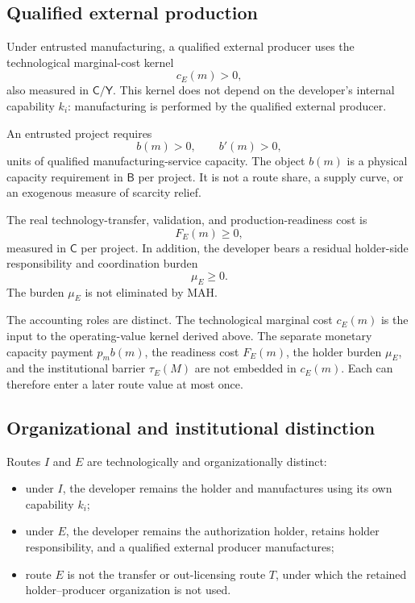 \subsection{Qualified external production}
\label{subsec:p03-external}

Under entrusted manufacturing, a qualified external producer uses the
technological marginal-cost kernel
\begin{equation}
  c_E(m)>0,
  \label{eq:p03-external-cost}
\end{equation}
also measured in \(\mathsf C/\mathsf Y\). This kernel does not depend on the
developer's internal capability \(k_i\): manufacturing is performed by the
qualified external producer.

An entrusted project requires
\begin{equation}
  b(m)>0,
  \qquad b'(m)>0,
  \label{eq:p03-capacity-requirement}
\end{equation}
units of qualified manufacturing-service capacity. The object \(b(m)\) is a
physical capacity requirement in \(\mathsf B\) per project. It is not a route
share, a supply curve, or an exogenous measure of scarcity relief.

The real technology-transfer, validation, and production-readiness cost is
\begin{equation}
  F_E(m)\geq0,
  \label{eq:p03-external-fixed-cost}
\end{equation}
measured in \(\mathsf C\) per project. In addition, the developer bears a
residual holder-side responsibility and coordination burden
\begin{equation}
  \mu_E\geq0.
  \label{eq:p03-holder-burden}
\end{equation}
The burden \(\mu_E\) is not eliminated by MAH.

The accounting roles are distinct. The technological marginal cost \(c_E(m)\)
is the input to the operating-value kernel derived above. The separate
monetary capacity payment \(p_m b(m)\), the readiness cost \(F_E(m)\), the
holder burden \(\mu_E\), and the institutional barrier \(\tau_E(M)\) are not
embedded in \(c_E(m)\). Each can therefore enter a later route value at most
once.

\subsection{Organizational and institutional distinction}
\label{subsec:p03-organization}

Routes \(I\) and \(E\) are technologically and organizationally distinct:
\begin{itemize}
  \item under \(I\), the developer remains the holder and manufactures using
  its own capability \(k_i\);
  \item under \(E\), the developer remains the authorization holder, retains
  holder responsibility, and a qualified external producer manufactures;
  \item route \(E\) is not the transfer or out-licensing route \(T\), under
  which the retained holder--producer organization is not used.
\end{itemize}

